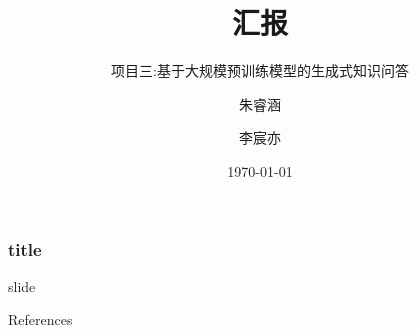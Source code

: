 \documentclass{beamer}
\title{汇报}
\subtitle{项目三:基于大规模预训练模型的生成式知识问答}
\author{朱睿涵 \and 李宸亦}
\date{\today}
\begin{document}
\frame{\titlepage} %


\begin{frame}
    \frametitle{title}

    slide

\end{frame}

\begin{frame}{References}

    \nocite{*}
    
    

\end{frame}
\end{document}
